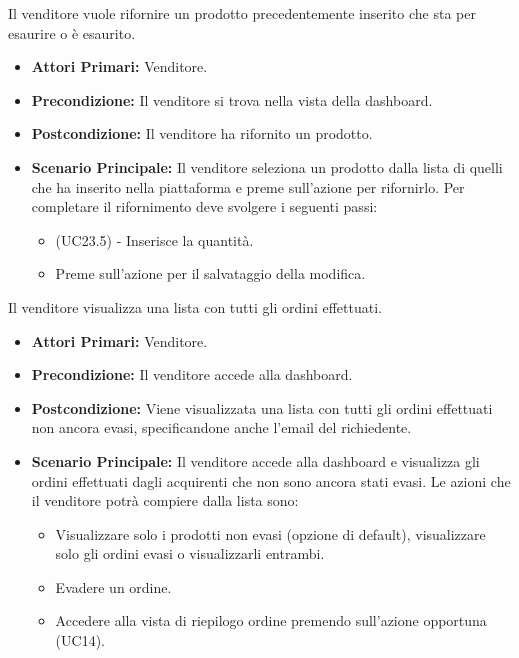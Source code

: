 Il venditore vuole rifornire un prodotto precedentemente inserito che sta per esaurire o è esaurito.
\begin{itemize}
    \item \textbf{Attori Primari:} Venditore.
    \item \textbf{Precondizione:} Il venditore si trova nella vista della dashboard.
    \item \textbf{Postcondizione:} Il venditore ha rifornito un prodotto.
    \item \textbf{Scenario Principale:} Il venditore seleziona un prodotto dalla lista di quelli che ha inserito nella piattaforma e preme sull'azione per rifornirlo. Per completare il rifornimento deve svolgere i seguenti passi:
    \begin{itemize}
        \item (UC23.5) - Inserisce la quantità.
        \item Preme sull'azione per il salvataggio della modifica.
    \end{itemize}
\end{itemize}

Il venditore visualizza una lista con tutti gli ordini effettuati.
\begin{itemize}
    \item \textbf{Attori Primari:} Venditore.
    \item \textbf{Precondizione:} Il venditore accede alla dashboard.
    \item \textbf{Postcondizione:} Viene visualizzata una lista con tutti gli ordini effettuati non ancora evasi, specificandone anche l'email del richiedente.
    \item \textbf{Scenario Principale:} Il venditore accede alla dashboard e visualizza gli ordini effettuati dagli acquirenti che non sono ancora stati evasi. Le azioni che il venditore potrà compiere dalla lista sono: 
    \begin{itemize}
        \item Visualizzare solo i prodotti non evasi (opzione di default), visualizzare solo gli ordini evasi o visualizzarli entrambi.
        \item Evadere un ordine.
        \item Accedere alla vista di riepilogo ordine premendo sull'azione opportuna (UC14).
    \end{itemize}
\end{itemize}
